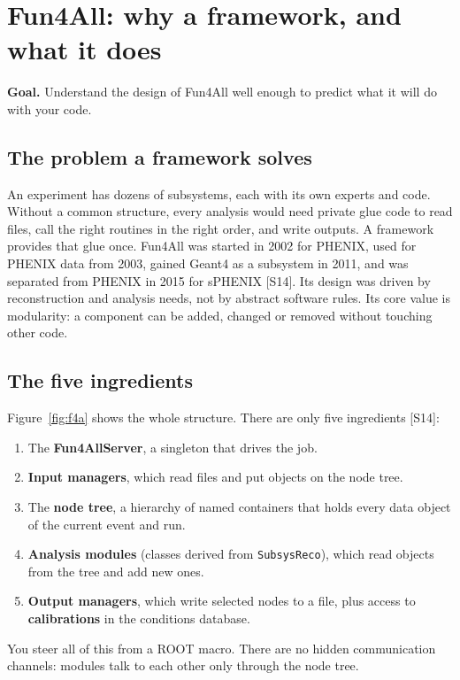 \documentclass[11pt,letterpaper]{article}
\newcommand{\goal}[1]{\par\noindent\textbf{Goal.} #1\par}
\begin{document}
\section{Fun4All: why a framework, and what it does}
\goal{Understand the design of Fun4All well enough to predict what it will do with your code.}

\subsection{The problem a framework solves}
An experiment has dozens of subsystems, each with its own experts and code.
Without a common structure, every analysis would need private glue code to read files, call the right routines in the right order, and write outputs.
A framework provides that glue once.
Fun4All was started in 2002 for PHENIX, used for PHENIX data from 2003, gained Geant4 as a subsystem in 2011, and was separated from PHENIX in 2015 for sPHENIX [S14].
Its design was driven by reconstruction and analysis needs, not by abstract software rules.
Its core value is modularity: a component can be added, changed or removed without touching other code.

\subsection{The five ingredients}
Figure~\ref{fig:f4a} shows the whole structure. There are only five ingredients [S14]:
\begin{enumerate}
\item The \textbf{Fun4AllServer}, a singleton that drives the job.
\item \textbf{Input managers}, which read files and put objects on the node tree.
\item The \textbf{node tree}, a hierarchy of named containers that holds every data object of the current event and run.
\item \textbf{Analysis modules} (classes derived from \texttt{SubsysReco}), which read objects from the tree and add new ones.
\item \textbf{Output managers}, which write selected nodes to a file, plus access to \textbf{calibrations} in the conditions database.
\end{enumerate}
You steer all of this from a ROOT macro. There are no hidden communication channels: modules talk to each other only through the node tree.
\end{document}
